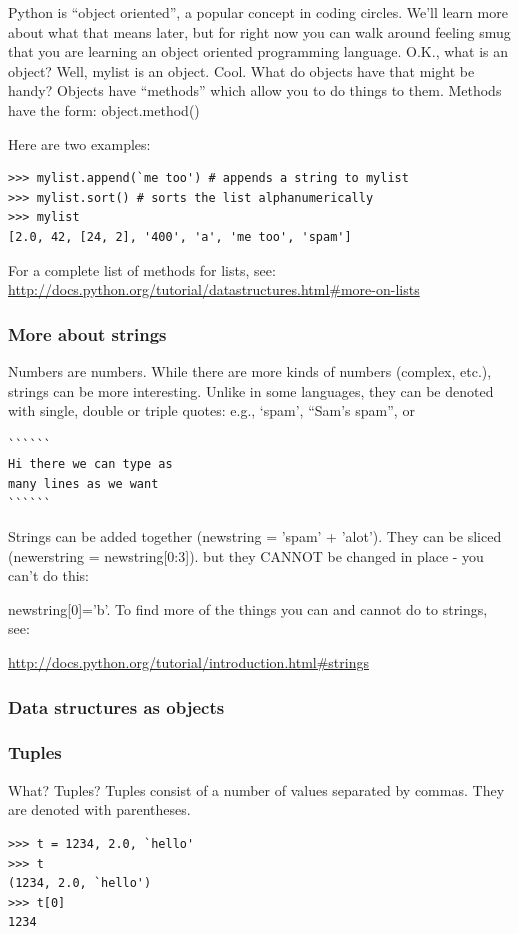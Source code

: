 \documentclass[11pt]{book}
\begin{document}
{Python is ``object oriented'', a popular concept in coding circles.  We'll learn more about what that means later, but for right now you can walk around feeling smug that you are learning an object oriented programming language.   O.K., what is an object?  Well,
{\color{blue}mylist} is an object.   Cool.  What do objects have that might be handy?
Objects have ``methods'' which allow you to do things to them.  Methods have the form:
{\color{blue}object.method()}

\noindent
Here are two examples:

{ \color{blue} \begin{verbatim}
>>> mylist.append(`me too') # appends a string to mylist
>>> mylist.sort() # sorts the list alphanumerically
>>> mylist
[2.0, 42, [24, 2], '400', 'a', 'me too', 'spam']
\end{verbatim}}


\noindent

 For a complete list of methods for lists, see:
\url{http://docs.python.org/tutorial/datastructures.html#more-on-lists}

\subsubsection{More about strings}
Numbers are numbers. While there are more kinds of numbers (complex, etc.),
strings can be  more interesting. Unlike in some languages, they can be denoted with single, double or triple quotes:  e.g.,
`spam',  ``Sam's spam'', or
{ \color{blue} \begin{verbatim}
``````
Hi there we can type as
many lines as we want
``````
\end{verbatim}}

Strings can be added together ({\color{blue}newstring = 'spam' + 'alot'}).  They  can be sliced ({\color{blue}newerstring = newstring[0:3]}).
but they CANNOT be changed in place - you can't do this: {{\color{blue}newstring[0]='b'}.
To find more of the things you can and cannot do to strings, see:

\url{http://docs.python.org/tutorial/introduction.html#strings}

\subsubsection{Data structures as objects}



\subsubsection{Tuples}
What?  Tuples?
Tuples consist of a number of values separated by commas.  They are denoted with parentheses.
{ \color{blue} \begin{verbatim}
>>> t = 1234, 2.0, `hello'
>>> t
(1234, 2.0, `hello')
>>> t[0]
1234
\end{verbatim}}

}}
\end{document}
